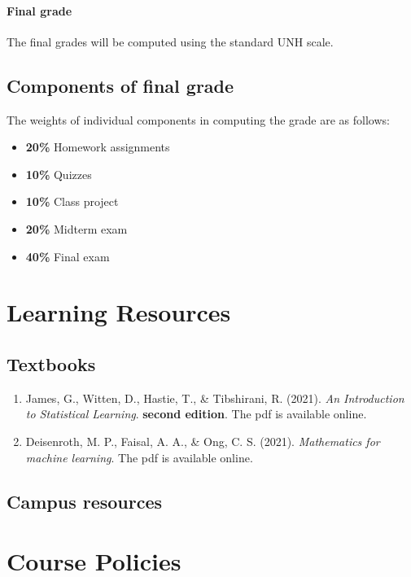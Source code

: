 \documentclass[11pt]{article}
\begin{document}
\paragraph{Final grade}
The final grades will be computed using the standard UNH scale.

\subsection{Components of final grade}

The weights of individual components in computing the grade are as follows:
\begin{itemize}
\item \textbf{20\%} Homework assignments  
\item \textbf{10\%} Quizzes 
\item \textbf{10\%} Class project 
\item \textbf{20\%} Midterm exam  
\item \textbf{40\%} Final exam 
\end{itemize}

\section{Learning Resources}

\subsection{Textbooks}

\begin{enumerate}

\item James, G., Witten, D., Hastie, T., \& Tibshirani, R. (2021). \emph{An Introduction to Statistical Learning}. \textbf{second edition}. The pdf is available online.

\item Deisenroth, M. P., Faisal, A. A., \& Ong, C. S. (2021). \emph{Mathematics for machine learning}. The pdf is available online.
\end{enumerate}

\subsection{Campus resources}

\section{Course Policies}
\end{document}
